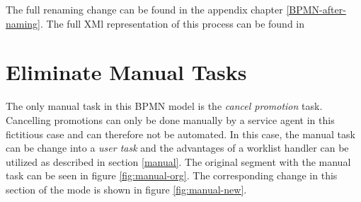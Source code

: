 The full renaming change can be found in the appendix chapter \ref{BPMN-after-naming}. The full XMl representation of this process can be found in \cite{online-BPMN-after-naming}

\section{Eliminate Manual Tasks}
The only manual task in this BPMN model is the \textit{cancel promotion} task. Cancelling promotions can only be done manually by a service agent in this fictitious case and can therefore not be automated. In this case, the manual task can be change into a \textit{user task} and the advantages of a worklist handler can be utilized as described in section \ref{manual}.
The original segment with the manual task can be seen in figure \ref{fig:manual-org}. The corresponding change in this section of the mode is shown in figure \ref{fig:manual-new}. 


